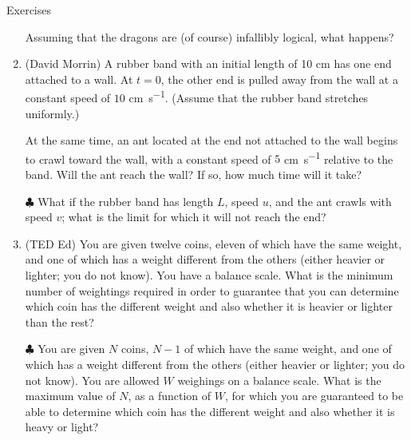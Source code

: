 \begin{xcb}{Exercises}
\begin{enumerate}
Assuming that the dragons are (of course) infallibly logical, what happens?
\begin{hint}
\end{hint}

\item (David Morrin)  A rubber band with an initial length of 10 cm has one end 
attached to a wall. 
At \(t = 0\), the other end is pulled away from the wall at a constant speed of \(10\) \si{\cm\per\second}. 
(Assume that the rubber band stretches uniformly.) 

At the same time, an ant located at the end not attached to the wall begins to crawl toward
the wall, with a constant speed of \(5\) \si{\cm\per\second} relative to the band. 
Will the ant reach the wall? If so, how much time will it take? 

\(\clubsuit\)  
What if the rubber band has length \(L\), speed \(u\), and the ant crawls with speed 
\(v\); what is the limit for which it will not reach the end?
\begin{hint}
\end{hint}

\item (TED Ed)  You are given twelve coins, eleven of which have the same weight, 
and one of which has a weight different from the others (either heavier or lighter; you do not know). 
You have a balance scale. What is the minimum number of weightings required in order to 
guarantee that you can determine which coin has the different weight and also whether it 
is heavier or lighter than the rest? 

\(\clubsuit\)  You are given \(N\) coins, \(N-1\) of which have the same weight, 
and one of which has a weight different from the others (either heavier or lighter; you do not know). 
You are allowed \(W\) weighings on a balance scale. 
What is the maximum value of \(N\), as a function of \(W\), 
for which you are guaranteed to be able to determine which coin has the different weight and 
also whether it is heavy or light?
\begin{hint}
\end{hint}


\end{enumerate}
\end{xcb}
